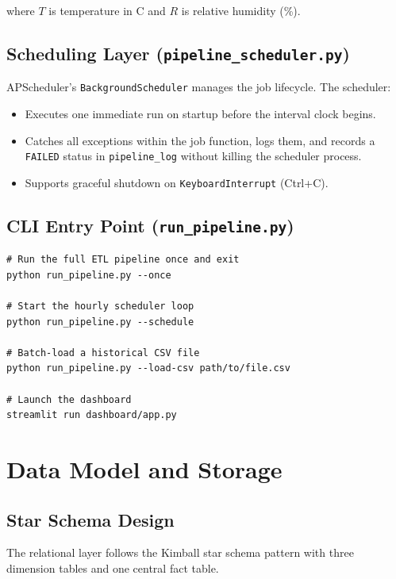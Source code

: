 \documentclass[12pt,a4paper]{report}
\begin{document}
where $T$ is temperature in \textdegree C and $R$ is relative humidity (\%).

\section{Scheduling Layer (\texttt{pipeline\_scheduler.py})}

APScheduler's \texttt{BackgroundScheduler} manages the job lifecycle. The scheduler:
\begin{itemize}
  \item Executes one immediate run on startup before the interval clock begins.
  \item Catches all exceptions within the job function, logs them, and records a \texttt{FAILED} status in \texttt{pipeline\_log} without killing the scheduler process.
  \item Supports graceful shutdown on \texttt{KeyboardInterrupt} (Ctrl+C).
\end{itemize}

\section{CLI Entry Point (\texttt{run\_pipeline.py})}

\begin{lstlisting}[style=bashstyle, caption={Available CLI commands}]
# Run the full ETL pipeline once and exit
python run_pipeline.py --once

# Start the hourly scheduler loop
python run_pipeline.py --schedule

# Batch-load a historical CSV file
python run_pipeline.py --load-csv path/to/file.csv

# Launch the dashboard
streamlit run dashboard/app.py
\end{lstlisting}

\chapter{Data Model and Storage}

\section{Star Schema Design}

The relational layer follows the Kimball star schema pattern with three dimension tables and one central fact table.
\end{document}
